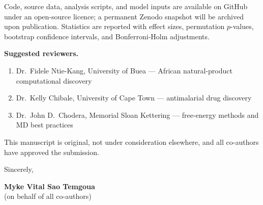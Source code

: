 \documentclass[11pt,letterpaper]{article}
\begin{document}
Code, source data, analysis scripts, and model inputs are available on GitHub under an open-source licence; a permanent Zenodo snapshot will be archived upon publication. Statistics are reported with effect sizes, permutation $p$-values, bootstrap confidence intervals, and Bonferroni-Holm adjustments.

\noindent\textbf{Suggested reviewers.}
\begin{enumerate}
  \item Dr.\ Fidele Ntie-Kang, University of Buea --- African natural-product computational discovery
  \item Dr.\ Kelly Chibale, University of Cape Town --- antimalarial drug discovery
  \item Dr.\ John D.\ Chodera, Memorial Sloan Kettering --- free-energy methods and MD best practices
\end{enumerate}

\noindent This manuscript is original, not under consideration elsewhere, and all co-authors have approved the submission.

\vspace{1em}

\noindent Sincerely,

\vspace{1em}

\noindent \textbf{Myke Vital Sao Temgoua} \\
(on behalf of all co-authors)
\end{document}
